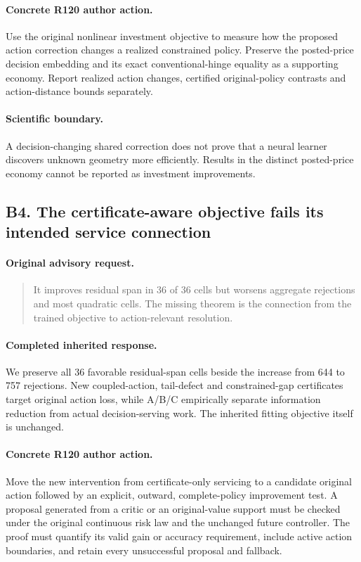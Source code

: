 \paragraph{Concrete R120 author action.}
Use the original nonlinear investment objective to measure how the proposed action correction changes a realized constrained policy. Preserve the posted-price decision embedding and its exact conventional-hinge equality as a supporting economy. Report realized action changes, certified original-policy contrasts and action-distance bounds separately.
\paragraph{Scientific boundary.}
A decision-changing shared correction does not prove that a neural learner discovers unknown geometry more efficiently. Results in the distinct posted-price economy cannot be reported as investment improvements.

\subsection{B4. The certificate-aware objective fails its intended service connection}
\label{response120:B4}
\paragraph{Original advisory request.}
\begin{quote}
It improves residual span in 36 of 36 cells but worsens aggregate rejections and most quadratic cells. The missing theorem is the connection from the trained objective to action-relevant resolution.
\end{quote}
\paragraph{Completed inherited response.}
We preserve all 36 favorable residual-span cells beside the increase from 644 to 757 rejections. New coupled-action, tail-defect and constrained-gap certificates target original action loss, while A/B/C empirically separate information reduction from actual decision-serving work. The inherited fitting objective itself is unchanged.
\paragraph{Concrete R120 author action.}
Move the new intervention from certificate-only servicing to a candidate original action followed by an explicit, outward, complete-policy improvement test. A proposal generated from a critic or an original-value support must be checked under the original continuous risk law and the unchanged future controller. The proof must quantify its valid gain or accuracy requirement, include active action boundaries, and retain every unsuccessful proposal and fallback.
